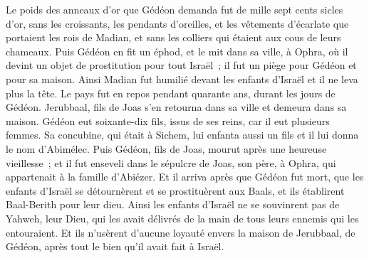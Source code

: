 \begin{multicols}{2}
Le poids des anneaux d'or que Gédéon demanda fut de mille sept cents sicles d'or, sans les croissants, les pendants d'oreilles, et les vêtements d'écarlate que portaient les rois de Madian, et sans les colliers qui étaient aux cous de leurs chameaux.
Puis Gédéon en fit un éphod, et le mit dans sa ville, à Ophra, où il devint un objet de prostitution pour tout Israël~; il fut un piège pour Gédéon et pour sa maison.
Ainsi Madian fut humilié devant les enfants d'Israël et il ne leva plus la tête. Le pays fut en repos pendant quarante ans, durant les jours de Gédéon.
Jerubbaal, fils de Joas s'en retourna dans sa ville et demeura dans sa maison.
Gédéon eut soixante-dix fils, issus de ses reins, car il eut plusieurs femmes.
Sa concubine, qui était à Sichem, lui enfanta aussi un fils et il lui donna le nom d'Abimélec.
Puis Gédéon, fils de Joas, mourut après une heureuse vieillesse~; et il fut enseveli dans le sépulcre de Joas, son père, à Ophra, qui appartenait à la famille d'Abiézer.
Et il arriva après que Gédéon fut mort, que les enfants d'Israël se détournèrent et se prostituèrent aux Baals, et ils établirent Baal-Berith pour leur dieu.
Ainsi les enfants d'Israël ne se souvinrent pas de Yahweh, leur Dieu, qui les avait délivrés de la main de tous leurs ennemis qui les entouraient.
Et ils n'usèrent d'aucune loyauté envers la maison de Jerubbaal, de Gédéon, après tout le bien qu'il avait fait à Israël.

\end{multicols}

